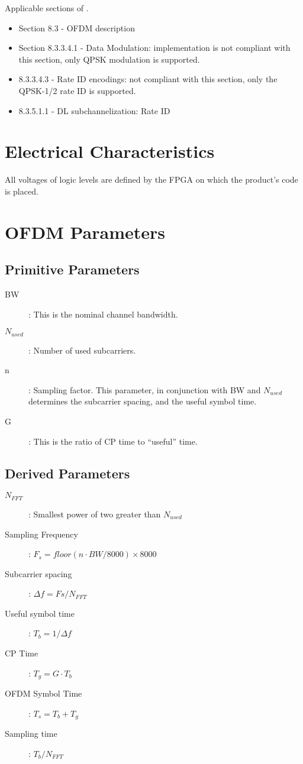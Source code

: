 \documentclass[dvips,10pt,twocolumn]{article}
\begin{document}
	Applicable sections of \cite{IEEE:802.16}.
	\begin{itemize}
		\item Section 8.3 - OFDM description
		\item Section 8.3.3.4.1 - Data Modulation: implementation
			is not compliant with this section, only QPSK
			modulation is supported.
		\item 8.3.3.4.3 - Rate ID encodings: not compliant with
			this section, only the QPSK-1/2 rate ID is supported.
		\item 8.3.5.1.1 - DL subchannelization: Rate ID
	\end{itemize}

\section{Electrical Characteristics}
All voltages of logic levels are defined by the FPGA on which the product's
code is placed.


\section{OFDM Parameters}

\subsection{Primitive Parameters}

\begin{description}
	\item[BW]: This is the nominal channel bandwidth.
	\item[$N_{used}$]: Number of used subcarriers.
	\item[n]: Sampling factor. This parameter, in conjunction with BW
		and $N_{used}$ determines the subcarrier spacing, and the
		useful symbol time.
	\item[G]: This is the ratio of CP time to ``useful'' time.
\end{description}



\subsection{Derived Parameters}

\begin{description}
	\item[$N_{FFT}$]: Smallest power of two greater than $N_{used}$
	\item[Sampling Frequency]: $F_s = floor ( n \cdot BW / 8000 )
		\times 8000 $
	\item[Subcarrier spacing]: $\Delta f = F s / N_{FFT} $
	\item[Useful symbol time]: $T_b = 1 / \Delta f$
	\item[CP Time]: $T_g = G \cdot T_b$
	\item[OFDM Symbol Time]: $T_s = T_b + T_g$
	\item[Sampling time]: $T_b / N_{FFT}$
\end{description}
\end{document}
